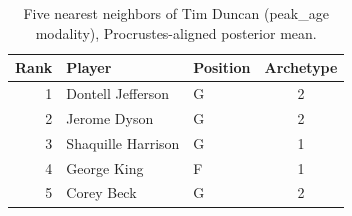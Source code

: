 \begin{table}[htbp]
  \centering\small
  \begin{tabular}{rllc}
    \toprule
    Rank & Player & Position & Archetype \\
    \midrule
    1 & Dontell Jefferson & G & 2 \\
    2 & Jerome Dyson & G & 2 \\
    3 & Shaquille Harrison & G & 1 \\
    4 & George King & F & 1 \\
    5 & Corey Beck & G & 2 \\
    \bottomrule
  \end{tabular}
  \caption{Five nearest neighbors of Tim Duncan (peak_age modality), Procrustes-aligned posterior mean.}
  \label{tab:Tim_Duncan_neighbors_peak_age}
\end{table}

